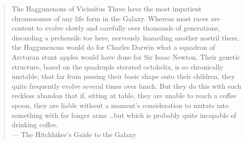\thispagestyle{empty}
\null
\vfill
\begin{quote}
The Haggunenons of Vicissitus Three have the most impatient chromosomes of any
life form in the Galaxy. Whereas most races are content to evolve slowly and
carefully over thousands of generations, discarding a prehensile toe here,
nervously hazarding another nostril there, the Haggunenons would do for Charles
Darwin what a squadron of Arcturan stunt apples would have done for Sir Isaac
Newton. Their genetic structure, based on the quadruple sterated octohelix, is
so chronically unstable, that far from passing their basic shape onto their
children, they quite frequently evolve several times over lunch. But they do
this with such reckless abandon that if, sitting at table, they are unable to
reach a coffee spoon, they are liable without a moment's consideration to mutate
into something with far longer arms \dots but which is probably quite incapable
of drinking coffee.\\
\null\hfill--- The Hitchhiker's Guide to the Galaxy \citep{adams1979}
\end{quote}
